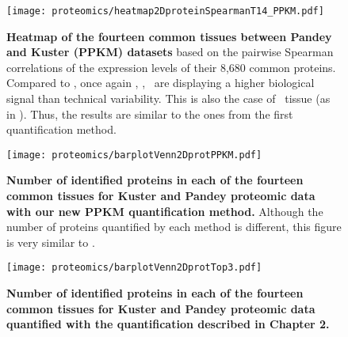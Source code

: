 \begin{figure}[!htpb]
    \texttt{[image: proteomics/heatmap2DproteinSpearmanT14\_PPKM.pdf]}\centering
    \caption[Heatmap of the 14 common tissues between Pandey and Kuster
    (Spearman correlation --- PPKM)]{\label{fig:heatmap3DProtT14PPKM}\textbf{Heatmap
    of the fourteen common tissues between Pandey and Kuster (PPKM) datasets}
    based on the pairwise Spearman correlations of the expression levels of
    their 8,680 common proteins.
    Compared to ,
    once again \Placenta, \Lung, \Kidney\ are displaying a higher biological signal
    than technical variability.
    This is also the case of \Adrenal\ tissue (as in ).
    Thus, the results are similar to the ones from the first quantification method.}
\end{figure}


\begin{figure}[!htpb]
    \texttt{[image: proteomics/barplotVenn2DprotPPKM.pdf]}\centering
    \vspace{-3mm}
    \caption[Identified proteins across the 14 shared tissues for 2 datasets (PPKM)]{%
    \label{fig:barplot2DvennprotPPKM}\textbf{Number of identified proteins in
    each of the fourteen common tissues for Kuster and Pandey proteomic data
    with our new PPKM quantification method.}
    Although the number of proteins quantified by each method is different,
    this figure is very similar to .}
\end{figure}

\begin{figure}[!htpb]
    \texttt{[image: proteomics/barplotVenn2DprotTop3.pdf]}\centering
    \vspace{-3mm}
    \caption[Identified proteins across the 14 shared tissues for 2 datasets
    (first method)]{%
    \label{fig:barplot2DvennprotTop3}\textbf{Number of identified proteins in
    each of the fourteen common tissues for Kuster and Pandey proteomic data
    quantified with the quantification described in Chapter 2.}}
\end{figure}

